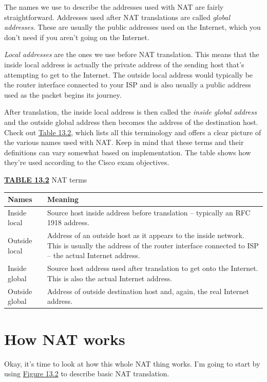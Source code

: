\documentclass[b5paper,11pt]{memoir}
\begin{document}
The names we use to describe the addresses used with NAT are fairly
straightforward. Addresses used after NAT translations are called
\emph{global addresses}. These are usually the public addresses used on
the Internet, which you don't need if you aren't going on the Internet.

\emph{Local addresses} are the ones we use before NAT translation. This
means that the inside local address is actually the private address of
the sending host that's attempting to get to the Internet. The outside
local address would typically be the router interface connected to your
ISP and is also usually a public address used as the packet begins its
journey.

After translation,
the inside local address is then called the \emph{inside global address}
and the outside global address then becomes the address of the
destination host. Check out
\protect\hyperlink{c13.xhtmlux5cux23table13-2}{Table 13.2}, which lists
all this terminology and offers a clear picture of the various names
used with NAT. Keep in mind that these terms and their definitions can
vary somewhat based on implementation. The table shows how they're used
according to the Cisco exam objectives.

{\protect\hyperlink{c13.xhtmlux5cux23tableanchor13-2}{\textbf{TABLE
13.2}} NAT terms}

\begin{longtable}[]{@{}ll@{}}
\toprule
Names & Meaning\tabularnewline
\midrule
\endhead
Inside local & Source host inside address before translation -- typically
an RFC 1918 address.\tabularnewline
Outside local & Address of an outside host as it appears to the inside
network. This is usually the address of the router interface connected
to ISP -- the actual Internet address.\tabularnewline
Inside global & Source host address used after translation to get onto
the Internet. This is also the actual Internet address.\tabularnewline
Outside global & Address of outside destination host and, again, the
real Internet address.\tabularnewline
\bottomrule
\end{longtable}




\section{How NAT works}

Okay, it's time to look at how this whole NAT thing works. I'm going to
start by using \protect\hyperlink{c13.xhtmlux5cux23figure13-2}{Figure
13.2} to describe basic NAT translation.
\end{document}
